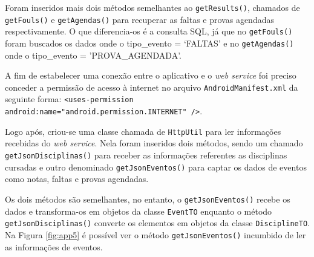 	\pagebreak
	
	\par Foram inseridos mais dois métodos semelhantes ao \texttt{getResults()},
chamados de \texttt{getFouls()} e \texttt{getAgendas()} para recuperar as
faltas e provas agendadas respectivamente. O que diferencia-os é a consulta
SQL, já que no \texttt{getFouls()} foram buscados os dados onde o tipo\_evento
= ‘FALTAS' e no \texttt{getAgendas()} onde o tipo\_evento = 'PROVA\_AGENDADA'.

	\par A fim de estabelecer uma conexão entre o aplicativo e o \textit{web
service} foi preciso conceder a permissão de acesso à internet no arquivo
\texttt{AndroidManifest.xml} da seguinte forma: \texttt{<uses-permission
android:name="android.permission.INTERNET" />}.

	\par Logo após, criou-se uma classe chamada de \texttt{HttpUtil} para ler
informações recebidas do \textit{web service}. Nela foram inseridos dois
métodos, sendo um chamado \texttt{getJsonDisciplinas()} para receber as
informações referentes as disciplinas cursadas e outro denominado
\texttt{getJsonEventos()} para captar os dados de eventos como notas, faltas e
provas agendadas.

	\par Os dois métodos são semelhantes, no entanto, o \texttt{getJsonEventos()}
recebe os dados e transforma-os em objetos da classe \texttt{EventTO} enquanto
o método \texttt{getJsonDisciplinas()} converte os elementos em objetos da
classe \texttt{DisciplineTO}. Na Figura \ref{fig:app5} é possível ver o método
\texttt{getJsonEventos()} incumbido de ler as informações de eventos.

